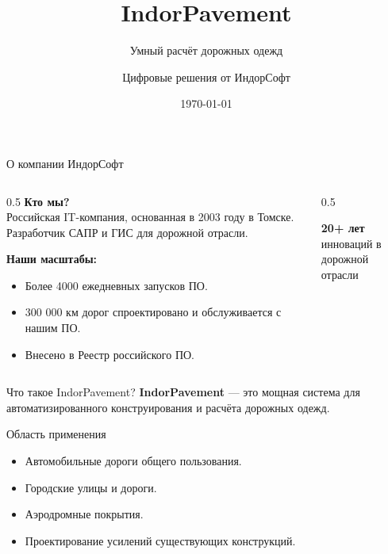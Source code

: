 \documentclass[aspectratio=169]{beamer}
\title{IndorPavement}
\subtitle{Умный расчёт дорожных одежд}
\date{\today}
\author{Цифровые решения от ИндорСофт}
\institute{САПР и BIM для точного проектирования}
\begin{document}
\maketitle

\begin{frame}{О компании ИндорСофт}
    \begin{columns}
        \begin{column}{0.5\textwidth}
            \textbf{Кто мы?} \\
            Российская IT-компания, основанная в 2003 году в Томске. Разработчик САПР и ГИС для дорожной отрасли.
            \vspace{0.5cm}
            
            \textbf{Наши масштабы:}
            \begin{itemize}
                \item Более \alert{4000} ежедневных запусков ПО.
                \item \alert{300 000 км} дорог спроектировано и обслуживается с нашим ПО.
                \item Внесено в Реестр российского ПО.
            \end{itemize}
        \end{column}
        \begin{column}{0.5\textwidth}
            \begin{center}
                \Huge \textcolor{AccentBlue}{\textbf{20+ лет}} \\
                \large инноваций в дорожной отрасли
            \end{center}
        \end{column}
    \end{columns}
\end{frame}

\begin{frame}{Что такое IndorPavement?}
    \textbf{IndorPavement} — это мощная система для автоматизированного конструирования и расчёта дорожных одежд.
    
    \vspace{0.5cm}
    \begin{block}{Область применения}
        \begin{itemize}
            \item Автомобильные дороги общего пользования.
            \item Городские улицы и дороги.
            \item Аэродромные покрытия.
            \item Проектирование усилений существующих конструкций.
        \end{itemize}
    \end{block}
\end{frame}
\end{document}
